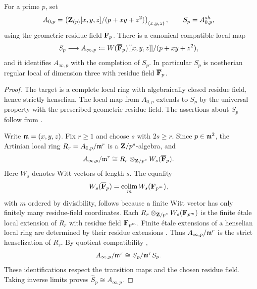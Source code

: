 \begin{lemma}
\label{d3:lem:stricthenselcompletion}
For a prime $p$, set
\[
 A_{0,p}=\left(\mathbf Z_{(p)}[x,y,z]/(p+xy+z^2)\right)_{(x,y,z)},
 \qquad S_p=A_{0,p}^{sh},
\]
using the geometric residue field $\overline{\mathbf F}_p$.
There is a canonical compatible local map
\[
 S_p\longrightarrow
 A_{\infty,p}\coloneqq W(\overline{\mathbf F}_p)[[x,y,z]]/(p+xy+z^2),
\]
and it identifies $A_{\infty,p}$ with the completion of $S_p$.
In particular $S_p$ is noetherian regular local of dimension three
with residue field $\overline{\mathbf F}_p$.
\end{lemma}
\begin{proof}
The target is a complete local ring with algebraically closed residue
field, hence strictly henselian.  The local map from $A_{0,p}$ extends
to $S_p$ by the universal property with the prescribed geometric
residue field.  The assertions about $S_p$ follow from
\cite[Section~15.46]{StacksHenselization}.

Write $\mathfrak m=(x,y,z)$.  Fix $r\geq1$ and choose $s$ with $2s\geq r$.
Since $p\in\mathfrak m^2$, the Artinian local ring
$R_r=A_{0,p}/\mathfrak m^r$ is a $\mathbf Z/p^s$-algebra, and
\[
 A_{\infty,p}/\mathfrak m^r
 \cong R_r\otimes_{\mathbf Z/p^s}W_s(\overline{\mathbf F}_p).
\]
Here $W_s$ denotes Witt vectors of length $s$.  The equality
\[
 W_s(\overline{\mathbf F}_p)=\operatorname*{colim}_m W_s(\mathbf F_{p^m}),
\]
with $m$ ordered by divisibility, follows because a finite Witt vector
has only finitely many residue-field coordinates.  Each
$R_r\otimes_{\mathbf Z/p^s}W_s(\mathbf F_{p^m})$ is the finite \'etale local extension
of $R_r$ with residue field $\mathbf F_{p^m}$.
Finite \'etale extensions of a henselian local ring are determined by
their residue extensions \cite[Tag~04GK]{StacksHenselization}.
Thus $A_{\infty,p}/\mathfrak m^r$ is the strict henselization of $R_r$.
By quotient compatibility
\cite[Section~10.156, Lemma~10.156.4]{StacksHenselization},
\[
 A_{\infty,p}/\mathfrak m^r\cong S_p/\mathfrak m^rS_p.
\]
These identifications respect the transition maps and the chosen
residue field.  Taking inverse limits proves
$\widehat S_p\cong A_{\infty,p}$.
\end{proof}

